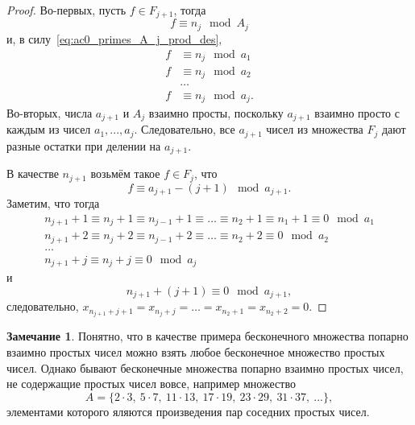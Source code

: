 \documentclass[a4paper,openbib]{article}
\theoremstyle{definition}
\newtheorem{remark}[lemma]{Замечание}
\begin{document}
\begin{proof}
	Во-первых, пусть $f \in F_{j+1}$,
	тогда
	\begin{equation}
		f \equiv n_j \mod A_j
	\end{equation}
	и, в силу~\eqref{eq:ac0_primes_A_j_prod_des},
	\begin{equation}
		\begin{array}{rl}
		f &\equiv n_j \mod a_1
		\\
		f &\equiv n_j \mod a_2
		\\
		&\dots
		\\
		f &\equiv n_j \mod a_j
		.
		\end{array}
	\end{equation}
	Во-вторых, числа $a_{j+1}$ и $A_j$ взаимно просты, поскольку $a_{j+1}$ взаимно просто с каждым из чисел $a_1,...,a_j$.
	Следовательно, все $a_{j+1}$ чисел из множества $F_j$ дают разные остатки при делении на $a_{j+1}$.
	
	В качестве $n_{j+1}$ возьмём такое $f\in F_j$, что
	\begin{equation}
		f \equiv a_{j+1} - (j+1) \mod a_{j+1}
		.
	\end{equation}
	Заметим, что тогда
	\begin{equation}
		\begin{array}{l}
			n_{j+1} + 1 \equiv n_j + 1 \equiv n_{j-1} + 1 \equiv \dots \equiv n_2 + 1 \equiv n_1 + 1 \equiv 0 \mod a_1
			\\
			n_{j+1} + 2 \equiv n_j + 2 \equiv n_{j-1} + 2 \equiv \dots \equiv n_2 + 2 \equiv 0 \mod a_2
			\\
			\dots
			\\
			n_{j+1} + j \equiv n_j + j  \equiv 0 \mod a_j
		\end{array}
	\end{equation}
	и
	\begin{equation}
		n_{j+1} + (j+1) \equiv 0 \mod a_{j+1}
		,
	\end{equation}
	следовательно, 
	$x_{n_{j+1} + j+1} = x_{n_{j} + j} = \dots = x_{n_2 + 1} = x_{n_2 + 2} = 0$.
	
	
\end{proof}

\begin{remark}
	Понятно, что в качестве примера бесконечного множества
	попарно взаимно простых чисел можно взять любое бесконечное множество простых чисел.
	Однако бывают бесконечные множества попарно взаимно простых чисел,
	не содержащие простых чисел вовсе, например множество
	\begin{equation}
		A = \{ 2\cdot 3,~5 \cdot 7,~11 \cdot 13,~17\cdot 19,~23\cdot29,~31\cdot 37,~...\},
	\end{equation}
	элементами которого яляются произведения пар соседних простых чисел.
\end{remark}
\end{document}
